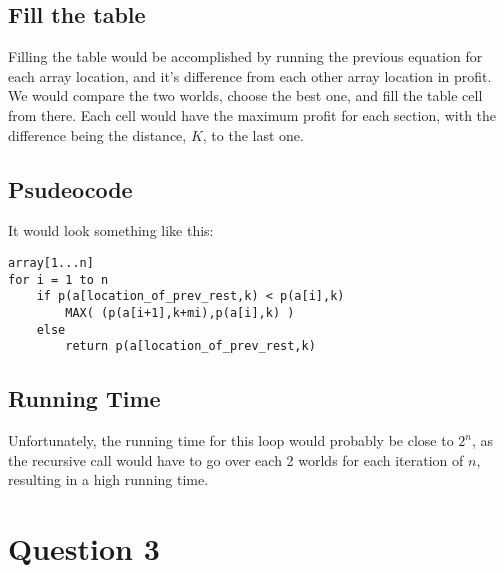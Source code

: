 \documentclass{article}
\begin{document}
\subsection{Fill the table}
Filling the table would be accomplished by running the previous equation for each array location, and it's difference from each other array location in profit. We would compare the two worlds, choose the best one, and fill the table cell from there. Each cell would have the maximum profit for each section, with the difference being the distance, $K$, to the last one.
\subsection{Psudeocode}
It would look something like this: \newline
\begin{lstlisting}
array[1...n]
for i = 1 to n
	if p(a[location_of_prev_rest,k) < p(a[i],k)
		MAX( (p(a[i+1],k+mi),p(a[i],k) )
	else
		return p(a[location_of_prev_rest,k)
\end{lstlisting}
\subsection{Running Time}
Unfortunately, the  running time for this loop would probably be close to $2^{n}$, as the recursive call would have to go over each 2 worlds for each iteration of $n$, resulting in a high running time. 
\section{Question 3}
\end{document}
